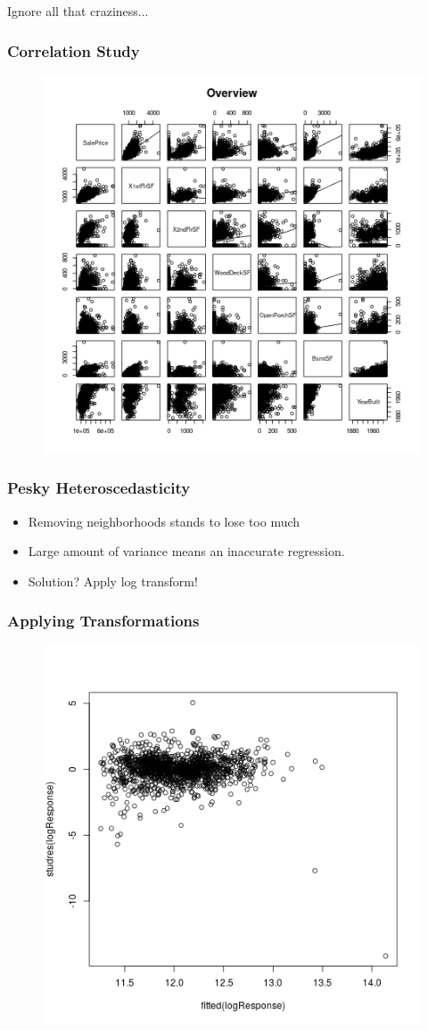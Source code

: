 \documentclass{beamer}
\begin{document}
\begin{frame}
\Huge{\centerline{Ignore all that craziness...}}
\end{frame}


\begin{frame}
\frametitle{Correlation Study}
\begin{figure}
\includegraphics[width=0.75\linewidth,keepaspectratio=true]{img/overview.png}
\end{figure}
\end{frame}


\begin{frame}
\frametitle{Pesky Heteroscedasticity}
\begin{itemize}
\item Removing neighborhoods stands to lose too much
\item Large amount of variance means an inaccurate regression.
\item  Solution? Apply log transform!
\end{itemize}
\end{frame}

\begin{frame}
\frametitle{Applying Transformations}
\begin{figure}
\includegraphics[width=0.75\linewidth,keepaspectratio=true]{img/regOverview.png}
\end{figure}
\end{frame}
\end{document}
